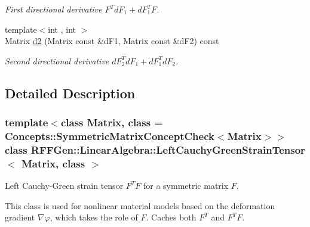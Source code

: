 \begin{DoxyCompactItemize}
\begin{DoxyCompactList}\small\item\em First directional derivative $ F^T dF_1 + dF_1^T F $. \end{DoxyCompactList}\item 
\hypertarget{classRFFGen_1_1LinearAlgebra_1_1LeftCauchyGreenStrainTensor_ad15848883104beb2265dfb459d96dff2}{{\footnotesize template$<$int , int $>$ }\\Matrix \hyperlink{classRFFGen_1_1LinearAlgebra_1_1LeftCauchyGreenStrainTensor_ad15848883104beb2265dfb459d96dff2}{d2} (Matrix const \&d\-F1, Matrix const \&d\-F2) const }\label{classRFFGen_1_1LinearAlgebra_1_1LeftCauchyGreenStrainTensor_ad15848883104beb2265dfb459d96dff2}

\begin{DoxyCompactList}\small\item\em Second directional derivative $ dF_2^T dF_1 + dF_1^T dF_2 $. \end{DoxyCompactList}\end{DoxyCompactItemize}


\subsection{Detailed Description}
\subsubsection*{template$<$class Matrix, class = Concepts\-::\-Symmetric\-Matrix\-Concept\-Check$<$\-Matrix$>$$>$class R\-F\-F\-Gen\-::\-Linear\-Algebra\-::\-Left\-Cauchy\-Green\-Strain\-Tensor$<$ Matrix, class $>$}

Left Cauchy-\/\-Green strain tensor $ F^T F $ for a symmetric matrix $ F $. 

This class is used for nonlinear material models based on the deformation gradient $\nabla\varphi$, which takes the role of $F$. Caches both $ F^T $ and $ F^T F $. 

